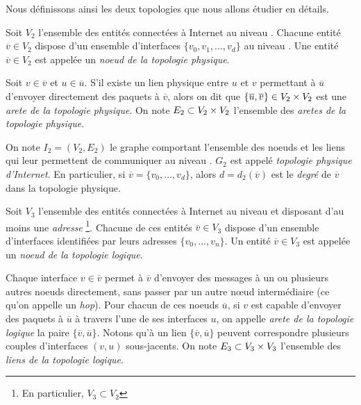 Nous définissons ainsi les deux topologies que nous allons étudier en détails.

\begin{definition}
\label{def:topologie-physique}
Soit $V_2$ l'ensemble des entités connectées à Internet au niveau \LL. Chacune
entité ${\overline v} \in V_2$ dispose d'un ensemble d'interfaces $\{v_0, v_1,
\ldots, v_d\}$ au niveau \LL. Une entité ${\overline v} \in V_2$ est appelée un
{\em noeud de la topologie physique}.
\end{definition}

\begin{definition}
\label{def:arete-topologie-physique}
Soit $v \in \overline{v}$ et $u \in \overline{u}$.
S'il existe un lien physique entre $u$ et $v$ permettant à $\overline{u}$
d'envoyer directement des paquets \ip à $\overline{v}$, alors on dit que
$\{\overline{u}, \overline{v}\} \in V_2 \times V_2$ est une {\em arete de la topologie physique}. On
note $E_2 \subset V_2 \times V_2$ l'ensemble des {\em aretes de la topologie
physique}.
\end{definition}

\begin{definition}
\label{def:degre-topologie-physique}
On note $I_2 = (V_2, E_2)$ le graphe comportant l'ensemble des noeuds \LL et les
liens qui leur permettent de communiquer au niveau \LL. $G_2$ est appelé {\em
topologie physique d'Internet}. En particulier, si ${\overline v} = \{v_0,
\ldots, v_d\}$, alors $d = d_2(\overline{v})$ est le {\em degré} de ${\overline
v}$ dans la topologie physique.
\end{definition}

\begin{definition}
\label{def:noeud-topologie-logique}
Soit $V_3$ l'ensemble des entités connectées à Internet au niveau \LLL et
disposant d'au moins une {\em adresse \ip}\footnote{En particulier, $V_3
\subset V_2$}.
Chacune de ces entités ${\overline v} \in V_3$ dispose d'un ensemble d'interfaces identifiées par leurs adresses
\ip $\{v_0, \ldots, v_n\}$. Un entité ${\overline v} \in V_3$ est appelée un
{\em noeud de la topologie logique}.
\end{definition}

\begin{definition}
\label{def:arete-topologie-logique}
Chaque interface $v \in {\overline v}$ permet à ${\overline v}$ d'envoyer des
messages à un ou plusieurs autres noeuds \LLL directement, sans passer par un
autre n\oe{}ud intermédiaire (ce qu'on appelle un {\em hop}).
Pour chacun de ces noeuds ${\overline u}$, si $v$ est capable d'envoyer des
paquets \ip à ${\overline u}$ à travers l'une de ses interfaces $u$, on appelle
{\em arete de la topologie logique} la paire $\{{\overline v}, {\overline u}\}$.
Notons qu'à un lien $\{{\overline v}, {\overline u}\}$ peuvent correspondre
plusieurs couples d'interfaces $(v, u)$ sous-jacents. On note $E_3 \subset
V_3 \times V_3$ l'ensemble des {\em liens de la topologie logique}.
\end{definition}

